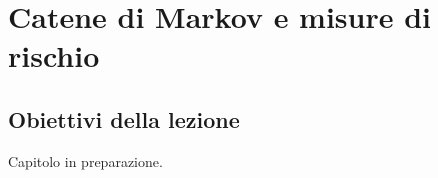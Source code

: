 
\chapter{Catene di Markov e misure di rischio}

\section{Obiettivi della lezione}

Capitolo in preparazione.

